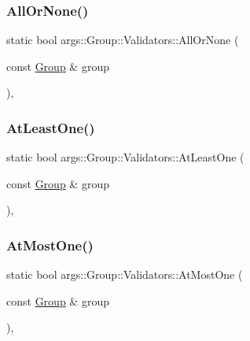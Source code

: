 \subsubsection{\texorpdfstring{All\+Or\+None()}{AllOrNone()}}
{\footnotesize\ttfamily static bool args\+::\+Group\+::\+Validators\+::\+All\+Or\+None (\begin{DoxyParamCaption}\item[{const \hyperlink{classargs_1_1_group}{Group} \&}]{group }\end{DoxyParamCaption})\hspace{0.3cm}{\ttfamily [inline]}, {\ttfamily [static]}}

\mbox{\label{structargs_1_1_group_1_1_validators_aaffeaa9014b817ac0f991f4a1160e200}} 
\subsubsection{\texorpdfstring{At\+Least\+One()}{AtLeastOne()}}
{\footnotesize\ttfamily static bool args\+::\+Group\+::\+Validators\+::\+At\+Least\+One (\begin{DoxyParamCaption}\item[{const \hyperlink{classargs_1_1_group}{Group} \&}]{group }\end{DoxyParamCaption})\hspace{0.3cm}{\ttfamily [inline]}, {\ttfamily [static]}}

\mbox{\label{structargs_1_1_group_1_1_validators_a2ba98505409f786976b8510c9872bb8d}} 
\subsubsection{\texorpdfstring{At\+Most\+One()}{AtMostOne()}}
{\footnotesize\ttfamily static bool args\+::\+Group\+::\+Validators\+::\+At\+Most\+One (\begin{DoxyParamCaption}\item[{const \hyperlink{classargs_1_1_group}{Group} \&}]{group }\end{DoxyParamCaption})\hspace{0.3cm}{\ttfamily [inline]}, {\ttfamily [static]}}


